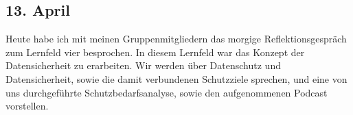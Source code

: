 \subsection{13. April}
Heute habe ich mit meinen Gruppenmitgliedern das morgige Reflektionsgespräch zum Lernfeld vier besprochen. In diesem Lernfeld war das Konzept der Datensicherheit zu erarbeiten. Wir werden über Datenschutz und Datensicherheit, sowie die damit verbundenen Schutzziele sprechen, und eine von uns durchgeführte Schutzbedarfsanalyse, sowie den aufgenommenen Podcast vorstellen.